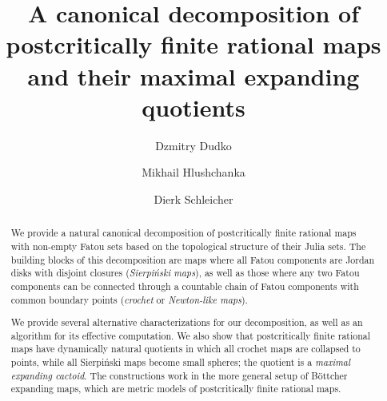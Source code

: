 \documentclass{amsart}
\title[A canonical decomposition of postcritically finite rational maps]{A canonical decomposition of \\ postcritically finite rational maps\\ and their maximal expanding quotients}
\author{Dzmitry Dudko}
\author{Mikhail Hlushchanka}
\author{Dierk Schleicher}
\theoremstyle{plain}
\theoremstyle{definition}
\theoremstyle{remark}
\begin{document}
\begin{abstract}


We provide a natural canonical decomposition of postcritically finite rational maps with non-empty Fatou sets based on the topological structure of their Julia sets. The building blocks of this decomposition are maps where all Fatou components are Jordan disks with disjoint closures (\emph{Sierpi\'{n}ski maps}), as well as those where any two Fatou components can be connected through a countable chain of Fatou components with common boundary points (\emph{crochet} or \emph{Newton-like maps}). 

We provide several alternative characterizations for our decomposition, as well as an algorithm for its effective computation. We also show that postcritically finite rational maps have dynamically natural quotients in which all crochet maps are collapsed to points, while all Sierpi\'{n}ski maps become small spheres; the quotient is a \emph{maximal expanding cactoid}. The constructions work in the more general setup of B\"{o}ttcher expanding maps, which are metric models of postcritically finite rational maps.

\end{abstract}
\end{document}
